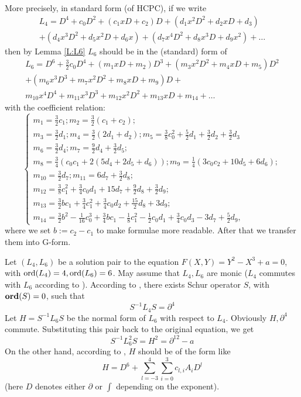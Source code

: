 \documentclass[11pt]{article}
\theoremstyle{definition}
\newcommand{\ord}{\mathop{\rm ord}\nolimits}
\theoremstyle{plain}
\numberwithin{equation}{section}
\newcommand{\Ord}{\mathop {\rm \bf ord}}
\begin{document}
More precisely, in standard form (of HCPC), if we write
\begin{multline*}
	L_4=D^4+c_0 D^2+(c_1xD+c_2)D+(d_1x^2D^2+d_2xD+d_3)
	\\+(d_4x^3D^2+d_5x^2D+d_6x)+(d_7x^4 D^2+d_8x^3D+d_9x^2)+\dots
\end{multline*}
then by Lemma \ref{L:L6} $L_6$ should be in the (standard) form of 
\begin{multline*}
L_6=D^6+\frac{3}{2}c_0 D^4+(m_1xD+m_2)D^3+(m_3x^2D^2+m_4xD+m_5)D^2
\\+(m_6x^3D^3+m_7x^2D^2+m_8xD+m_9)D+
\\m_{10}x^4D^4+m_{11}x^3D^3+m_{12}x^2D^2+m_{13}xD+m_{14}+\dots
\end{multline*}
with the coefficient relation:
$$
\begin{cases}
	m_1=\frac{3}{2}c_1;m_2=\frac{3}{2}(c_1+c_2);
	\\m_{3}=\frac{3}{2}d_1;m_{4}=\frac{3}{2}(2d_1+d_2);m_5=\frac{3}{8}c_0^2+\frac{5}{2}d_1+\frac{3}{2}d_2+\frac{3}{2}d_3
	\\m_6 = \frac{3}{2} d_4;m_7 = \frac{9}{2}d_4 + \frac{3}{2} d_5;
	\\m_8 = \frac{3}{4} (c_0 c_1 + 2 (5 d_4 + 2 d_5 + d_6));m_9 = \frac{1}{4} (3 c_0 c_2 + 10 d_5 + 6 d_6);
	\\m_{10} = \frac{3}{2}d_7;m_{11} = 6 d_7 + \frac{3}{2}d_8;
	\\m_{12} = \frac{3}{8}c_1^2 + \frac{3}{4}c_0d_1+ 15 d_7 + \frac{9}{2}d_8 +\frac{3}{2}d_9;
	\\m_{13} = \frac{3}{2}b c_1 + \frac{3}{4}c_1^2 + \frac{3}{4}c_0d_2 + \frac{15}{2}d_8 + 
	3 d_9; 
	\\m_{14} = \frac{3}{2}b^2 - \frac{1}{16}c_0^3 + \frac{3}{4}b c_1 - \frac{1}{8} c_1^2 - \frac{1}{2}c_0d_1 + \frac{3}{4}c_0d_3 - 3 d_7 + \frac{5}{2}d_9,
\end{cases}
$$
where we set $b:=c_2-c_1$ to make formulae more readable. 
After that we transfer them into G-form.


Let $(L_{4},L_{6})$ be a solution pair to the equation  $F(X,Y)=Y^2-X^3+a=0$, with $\ord (L_{4})=4, \ord(L_{6})=6$. May assume that $L_{4}, L_6$ are monic ($L_{4}$ commutes with $L_{6}$ according to \cite{BC1}). According to \cite[Prop. 2.3]{GZ24}, there exists Schur operator $S$, with $\Ord (S)=0$, such that
$$
S^{-1}L_{4}S=\partial^{4}
$$
Let $H=S^{-1}L_{6}S$  be the normal form of $L_6$ with respect to $L_4$. Obviously  $H, \partial^4$ commute. Substituting this pair back to the original equation, we  get 
$$
S^{-1}L_{6}^{2}S=H^2=\partial^{12}-a
$$
On the other hand, according to \cite[Prop. 2.1]{GZ24}, $H$ should be of the form like
$$
H=D^6+\sum_{l=-3}^{4}\sum_{i=0}^3 c_{l,i}A_iD^l
$$
(here $D$ denotes either $\partial$ or $\int$ depending on the exponent).
\end{document}
